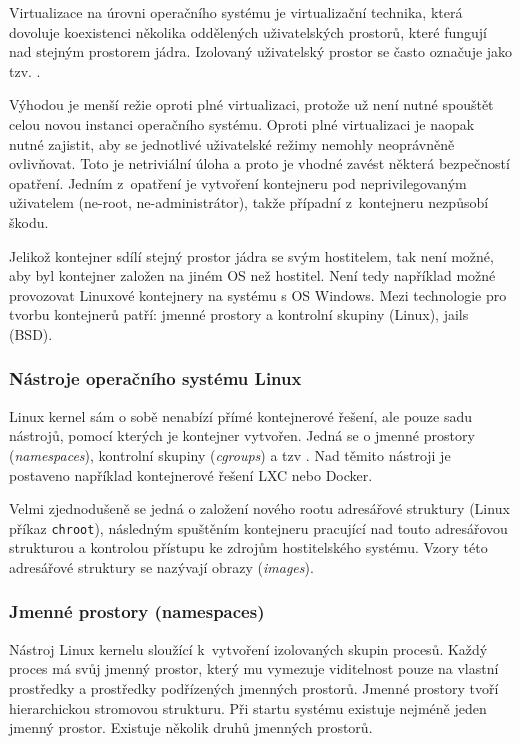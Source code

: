 
Virtualizace na úrovni operačního systému je virtualizační technika, která dovoluje koexistenci několika oddělených uživatelských prostorů, které fungují nad stejným prostorem jádra.
Izolovaný uživatelský prostor se často označuje jako tzv. .

Výhodou je menší režie oproti plné virtualizaci, protože už není nutné spouštět celou novou instanci operačního systému.
Oproti plné virtualizaci je naopak nutné zajistit, aby se jednotlivé uživatelské režimy nemohly neoprávněně ovlivňovat.
Toto je netriviální úloha a proto je vhodné zavést některá bezpečností opatření.
Jedním z~opatření je vytvoření kontejneru pod neprivilegovaným uživatelem (ne-root, ne-administrátor), takže případní  z~kontejneru nezpůsobí škodu.

Jelikož kontejner sdílí stejný prostor jádra se svým hostitelem, tak není možné, aby byl kontejner založen na jiném OS než hostitel.
Není tedy například možné provozovat Linuxové kontejnery na systému s OS Windows.
Mezi technologie pro tvorbu kontejnerů patří: jmenné prostory a kontrolní skupiny (Linux), jails (BSD).

\subsubsection{Nástroje operačního systému Linux}

Linux kernel sám o sobě nenabízí přímé kontejnerové řešení, ale pouze sadu nástrojů, pomocí kterých je kontejner vytvořen.
Jedná se o jmenné prostory (\textit{namespaces}), kontrolní skupiny (\textit{cgroups}) a tzv .
Nad těmito nástroji je postaveno například kontejnerové řešení LXC nebo Docker.

Velmi zjednodušeně se jedná o založení nového rootu adresářové struktury (Linux příkaz \verb|chroot|), následným spuštěním kontejneru pracující nad touto adresářovou strukturou a kontrolou přístupu ke zdrojům hostitelského systému.
Vzory této adresářové struktury se nazývají obrazy (\textit{images}).

\subsubsection{Jmenné prostory (namespaces)}

Nástroj Linux kernelu sloužící k~vytvoření izolovaných skupin procesů.
Každý proces má svůj jmenný prostor, který mu vymezuje viditelnost pouze na vlastní prostředky a prostředky podřízených jmenných prostorů.
Jmenné prostory tvoří hierarchickou stromovou strukturu.
Při startu systému existuje nejméně jeden jmenný prostor.
Existuje několik druhů jmenných prostorů.

